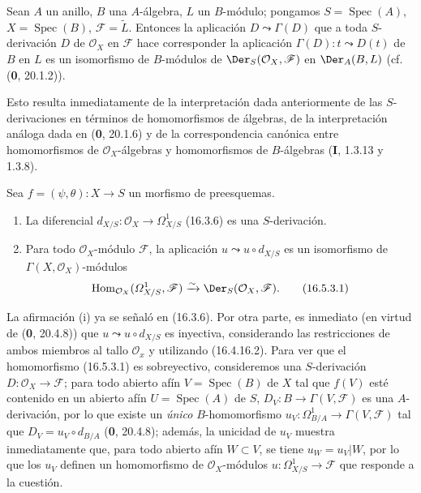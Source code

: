 \begin{proposition}[16.5.2]
\label{IV.16.5.2}
Sean $A$ un anillo, $B$ una $A$-álgebra, $L$ un $B$-módulo; pongamos
$S=\operatorname{Spec}(A)$, $X=\operatorname{Spec}(B)$,
$\mathscr{F}=\widetilde{L}$. Entonces la aplicación $D\leadsto\Gamma(D)$ que a
toda $S$-derivación $D$ de $\mathcal{O}_X$ en $\mathscr{F}$ hace
corresponder la aplicación $\Gamma(D):t\leadsto D(t)$ de $B$ en $L$ es un
isomorfismo de $B$-módulos de
$\Der_S(\mathcal{O}_X,\mathscr{F})$ en
$\Der_A(B,L)$ \textup{(cf. (\textbf 0, 20.1.2))}.
\end{proposition}

Esto resulta inmediatamente de la interpretación dada anteriormente de las $S$-derivaciones
en términos
de homomorfismos de álgebras, de la interpretación análoga dada en
(\textbf 0, 20.1.6) y de la correspondencia canónica entre homomorfismos de
$\mathcal{O}_X$-álgebras y homomorfismos de $B$-álgebras (\textbf I, 1.3.13 y
1.3.8).

\begin{proposition}[16.5.3]
\label{IV.16.5.3}
Sea $f=(\psi,\theta):X\to S$ un morfismo de preesquemas.
\begin{enumerate}
\item[\textup{(i)}] La diferencial
$d_{X/S}:\mathcal{O}_X\to\varOmega_{X/S}^1$ \textup{(16.3.6)} es una $S$-derivación.
\item[\textup{(ii)}] Para todo $\mathcal{O}_X$-módulo $\mathscr{F}$, la aplicación
$u\leadsto u\circ d_{X/S}$ es un isomorfismo de
$\Gamma(X,\mathcal{O}_X)$-módulos
\[
  \operatorname{Hom}_{\mathcal{O}_X}(\varOmega_{X/S}^1,\mathscr{F})
  \xrightarrow{\sim}
  \Der_S(\mathcal{O}_X,\mathscr{F}).
  \tag{16.5.3.1}
  \label{IV.16.5.3.1}
\]
\end{enumerate}
\end{proposition}

La afirmación (i) ya se señaló en (16.3.6). Por otra parte, es inmediato (en
virtud de (\textbf 0, 20.4.8)) que $u\leadsto u\circ d_{X/S}$ es inyectiva, considerando
las restricciones de ambos miembros al tallo $\mathcal{O}_x$ y utilizando
(16.4.16.2). Para ver que el homomorfismo (16.5.3.1) es sobreyectivo,
consideremos una $S$-derivación $D:\mathcal{O}_X\to\mathscr{F}$; para todo
abierto afín $V=\operatorname{Spec}(B)$ de $X$ tal que $f(V)$ esté contenido
en un abierto afín $U=\operatorname{Spec}(A)$ de $S$,
$D_V:B\to\Gamma(V,\mathscr{F})$ es una $A$-derivación, por lo que existe un
\emph{único} $B$-homomorfismo
$u_V:\Omega_{B/A}^1\to\Gamma(V,\mathscr{F})$ tal que
$D_V=u_V\circ d_{B/A}$ (\textbf 0, 20.4.8); además, la unicidad de $u_V$ muestra
inmediatamente que, para todo abierto afín $W\subset V$, se tiene $u_W=u_V|W$, por lo que los
$u_V$ definen un homomorfismo de $\mathcal{O}_X$-módulos
$u:\varOmega_{X/S}^1\to\mathscr{F}$ que responde a la cuestión.

